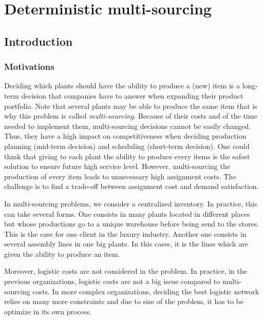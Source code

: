 \chapter{Deterministic multi-sourcing}
\label{chap:multi-sourcing:deterministic}

\section{Introduction}


\subsection{Motivations}
\label{sec:multi-sourcing:deterministic:introduction:motivations}


Deciding which plants should have the ability to produce a (new) item is a long-term decision that companies have to answer when expanding their product portfolio.
Note that several plants may be able to produce the same item that is why this problem is called \emph{multi-sourcing}.
Because of their costs and of the time needed to implement them, multi-sourcing decisions cannot be easily changed.
Thus, they have a high impact on competitiveness when deciding production planning (mid-term decision) and scheduling (short-term decision).
One could think that giving to each plant the ability to produce every items is the safest solution to ensure future high service level.
However, multi-sourcing the production of every item leads to unnecessary high assignment costs.
The challenge is to find a trade-off between assignment cost and demand satisfaction.


In multi-sourcing problems, we consider a centralized inventory.
In practice, this can take several forms.
One consists in many plants located in different places but whose productions go to a unique warehouse before being send to the stores.
This is the case for one client in the luxury industry.
Another one consists in several assembly lines in one big plants.
In this cases, it is the lines which are given the ability to produce an item.


Moreover, logistic costs are not considered in the problem.
In practice, in the previous organizations, logistic costs are not a big issue compared to multi-sourcing costs.
In more complex organizations, deciding the best logistic network relies on many more constraints and due to size of the problem, it has to be optimize in its own process.


